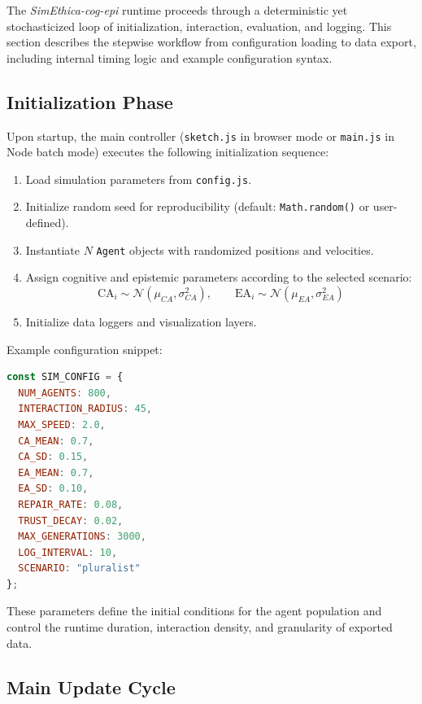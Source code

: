 \documentclass[11pt]{article}
\begin{document}
The \textit{SimEthica-cog-epi} runtime proceeds through a deterministic yet stochasticized loop of initialization, interaction, evaluation, and logging. This section describes the stepwise workflow from configuration loading to data export, including internal timing logic and example configuration syntax.

\subsection{Initialization Phase}

Upon startup, the main controller (\texttt{sketch.js} in browser mode or \texttt{main.js} in Node batch mode) executes the following initialization sequence:

\begin{enumerate}
  \item Load simulation parameters from \texttt{config.js}.
  \item Initialize random seed for reproducibility (default: \texttt{Math.random()} or user-defined).
  \item Instantiate $N$ \texttt{Agent} objects with randomized positions and velocities.
  \item Assign cognitive and epistemic parameters according to the selected scenario:
  \[
  \text{CA}_i \sim \mathcal{N}(\mu_{CA}, \sigma_{CA}^2), \qquad \text{EA}_i \sim \mathcal{N}(\mu_{EA}, \sigma_{EA}^2)
  \]
  \item Initialize data loggers and visualization layers.
\end{enumerate}

Example configuration snippet:

\begin{lstlisting}[language=JavaScript,caption={Configuration parameters in config.js}]
const SIM_CONFIG = {
  NUM_AGENTS: 800,
  INTERACTION_RADIUS: 45,
  MAX_SPEED: 2.0,
  CA_MEAN: 0.7,
  CA_SD: 0.15,
  EA_MEAN: 0.7,
  EA_SD: 0.10,
  REPAIR_RATE: 0.08,
  TRUST_DECAY: 0.02,
  MAX_GENERATIONS: 3000,
  LOG_INTERVAL: 10,
  SCENARIO: "pluralist"
};
\end{lstlisting}

These parameters define the initial conditions for the agent population and control the runtime duration, interaction density, and granularity of exported data.

\subsection{Main Update Cycle}
\end{document}
